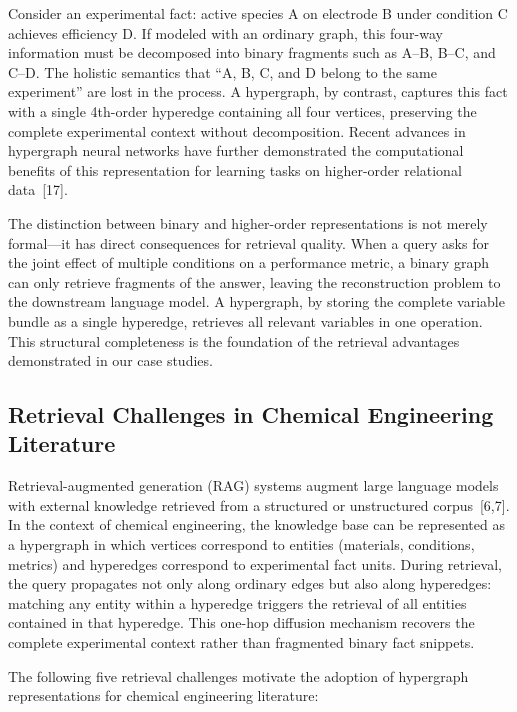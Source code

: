 \documentclass[11pt,a4paper]{article}
\begin{document}
Consider an experimental fact: active species A on electrode B under condition C achieves efficiency D. If modeled with an ordinary graph, this four-way information must be decomposed into binary fragments such as A--B, B--C, and C--D. The holistic semantics that ``A, B, C, and D belong to the same experiment'' are lost in the process. A hypergraph, by contrast, captures this fact with a single 4th-order hyperedge containing all four vertices, preserving the complete experimental context without decomposition. Recent advances in hypergraph neural networks have further demonstrated the computational benefits of this representation for learning tasks on higher-order relational data~[17].

The distinction between binary and higher-order representations is not merely formal---it has direct consequences for retrieval quality. When a query asks for the joint effect of multiple conditions on a performance metric, a binary graph can only retrieve fragments of the answer, leaving the reconstruction problem to the downstream language model. A hypergraph, by storing the complete variable bundle as a single hyperedge, retrieves all relevant variables in one operation. This structural completeness is the foundation of the retrieval advantages demonstrated in our case studies.

\subsection{Retrieval Challenges in Chemical Engineering Literature}
\label{subsec:challenges}

Retrieval-augmented generation (RAG) systems augment large language models with external knowledge retrieved from a structured or unstructured corpus~[6,7]. In the context of chemical engineering, the knowledge base can be represented as a hypergraph in which vertices correspond to entities (materials, conditions, metrics) and hyperedges correspond to experimental fact units. During retrieval, the query propagates not only along ordinary edges but also along hyperedges: matching any entity within a hyperedge triggers the retrieval of all entities contained in that hyperedge. This one-hop diffusion mechanism recovers the complete experimental context rather than fragmented binary fact snippets.

The following five retrieval challenges motivate the adoption of hypergraph representations for chemical engineering literature:
\end{document}
